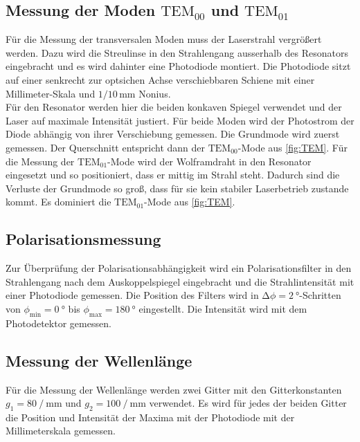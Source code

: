 \subsection{Messung der Moden $\mathrm{TEM}_{00}$ und $\mathrm{TEM}_{01}$}
Für die Messung der transversalen Moden muss der Laserstrahl vergrößert werden. Dazu wird die Streulinse in den Strahlengang ausserhalb des Resonators eingebracht und es wird dahinter eine Photodiode montiert.
Die Photodiode sitzt auf einer senkrecht zur optsichen Achse verschiebbaren Schiene mit einer Millimeter-Skala und $1/10\,\unit{\milli\meter}$ Nonius.\\
Für den Resonator werden hier die beiden konkaven Spiegel verwendet und der Laser auf maximale Intensität justiert.
Für beide Moden wird der Photostrom der Diode abhängig von ihrer Verschiebung gemessen.
Die Grundmode wird zuerst gemessen.
Der Querschnitt entspricht dann der $\mathrm{TEM}_{00}$-Mode aus \autoref{fig:TEM}.
Für die Messung der $\mathrm{TEM}_{01}$-Mode wird der Wolframdraht in den Resonator eingesetzt und so positioniert, dass er mittig im Strahl steht.%
Dadurch sind die Verluste der Grundmode so groß, dass für sie kein stabiler Laserbetrieb zustande kommt. 
Es dominiert die  $\mathrm{TEM}_{01}$-Mode aus \autoref{fig:TEM}.
% 
%
%
%
\subsection{Polarisationsmessung}
Zur Überprüfung der Polarisationsabhängigkeit wird ein Polarisationsfilter in den Strahlengang nach dem Auskoppelspiegel eingebracht und die Strahlintensität mit einer Photodiode gemessen.
Die Position des Filters wird in $ \increment \phi = \qty{2}{\degree}$-Schritten von $\phi_{\min} = \qty{0}{\degree}$ bis $\phi_{\max} = \qty{180}{\degree}$ eingestellt.
Die Intensität wird mit dem Photodetektor gemessen.
%
%
%
%
%
\subsection{Messung der Wellenlänge}
Für die Messung der Wellenlänge werden zwei Gitter mit den Gitterkonstanten $g_1 = 80\mathbin{/}\unit{\milli\meter}$ und $g_2 = 100\mathbin{/}\unit{\milli\meter}$ verwendet.
Es wird für jedes der beiden Gitter die Position und Intensität der Maxima mit der Photodiode mit der Millimeterskala gemessen.
